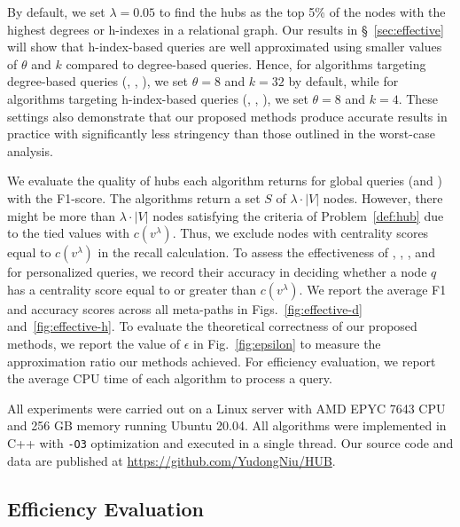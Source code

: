

By default, we set $\lambda = 0.05$ to find the hubs as the top 5\% of the nodes with the highest degrees or h-indexes in a relational graph.
Our results in \S~\ref{sec:effective} will show that h-index-based \ced queries are well approximated using smaller values of $\theta$ and $k$ compared to degree-based \ced queries.
Hence, for algorithms targeting degree-based \ced queries (\glod, \perd, \perde), we set $\theta=8$ and $k=32$ by default, while for algorithms targeting h-index-based \ced queries (\gloh, \perh, \perhe), we set $\theta=8$ and $k=4$.
These settings also demonstrate that our proposed methods produce accurate results in practice with significantly less stringency than those outlined in the worst-case analysis.

\vspace{1mm}
We evaluate the quality of hubs each algorithm returns for global \ced queries (\glod and \gloh) with the F1-score.
The algorithms return a set $S$ of $\lambda \cdot |V|$ nodes.
However, there might be more than $\lambda \cdot |V|$ nodes satisfying the criteria of Problem~\ref{def:hub} due to the tied values with $c(v^\lambda)$.
Thus, we exclude nodes with centrality scores equal to $c(v^\lambda)$ in the recall calculation.
To assess the effectiveness of \perd, \perde, \perh, and \perhe for personalized \ced queries, we record their accuracy in deciding whether a node $q$ has a centrality score equal to or greater than $c(v^\lambda)$. We report the average F1 and accuracy scores across all meta-paths in Figs.~\ref{fig:effective-d} and~\ref{fig:effective-h}.
To evaluate the theoretical correctness of our proposed methods, we report the value of $\epsilon$ in Fig.~\ref{fig:epsilon} to measure the approximation ratio our methods achieved.
For efficiency evaluation, we report the average CPU time of each algorithm to process a \ced query.

\vspace{1mm}
All experiments were carried out on a Linux server with AMD EPYC 7643 CPU and 256 GB memory running Ubuntu 20.04.
All algorithms were implemented in C++ with \texttt{-O3} optimization and executed in a single thread.
Our source code and data are published at \url{https://github.com/YudongNiu/HUB}.

\subsection{Efficiency Evaluation}
\label{sec:efficiency}

